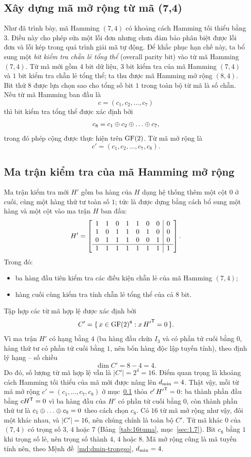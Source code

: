 \subsection{Xây dựng mã mở rộng từ mã (7,4)}
\label{ss:2.7.1}

Như đã trình bày, mã Hamming $(7,4)$ có khoảng cách Hamming tối thiểu bằng $3$.
Điều này cho phép sửa một lỗi đơn nhưng chưa đảm bảo phân biệt được lỗi đơn và
lỗi kép trong quá trình giải mã tự động. Để khắc phục hạn chế này, ta bổ sung
một \emph{bit kiểm tra chẵn lẻ tổng thể} (overall parity bit) vào từ mã Hamming
$(7,4)$. Từ mã mới gồm $4$ bit dữ liệu, $3$ bit kiểm tra của mã Hamming $(7,4)$
và $1$ bit kiểm tra chẵn lẻ tổng thể; ta thu được mã Hamming mở rộng $(8,4)$. Bit thứ $8$ được lựa chọn sao
cho tổng số bit $1$ trong toàn bộ từ mã là số chẵn. Nếu từ mã Hamming ban đầu là
\[
  c = (c_1, c_2, \dots, c_7)
\]
thì bit kiểm tra tổng thể được xác định bởi
\[
  c_8 = c_1 \xor c_2 \xor \dots \xor c_7 ,
\]
trong đó phép cộng được thực hiện trên $\mathrm{GF}(2)$. Từ mã mở rộng là
\[
  c' = (c_1, c_2, \dots, c_7, c_8) .
\]

\subsection{Ma trận kiểm tra của mã Hamming mở rộng}
\label{ss:2.7.2}

Ma trận kiểm tra mới $H'$ gồm ba hàng của $H$ dạng hệ thống thêm một cột $0$ ở
cuối, cùng một hàng thứ tư toàn số $1$; tức là được dựng bằng cách bổ sung một
hàng và một cột vào ma trận $H$ ban đầu:
\begin{equation}\label{eq:Hmr}
  H' = \left[\begin{array}{ccccccc|c} 1 & 1 & 0 & 1 & 1 & 0 & 0 & 0\\ 1 & 0 & 1 & 1 & 0 & 1 & 0 & 0\\ 0 & 1 & 1 & 1 & 0 & 0 & 1 & 0\\ \hline 1 & 1 & 1 & 1 & 1 & 1 & 1 & 1 \end{array}\right] .
\end{equation}
Trong đó:
\begin{itemize}
  \item ba hàng đầu tiên kiểm tra các điều kiện chẵn lẻ của mã Hamming
        $(7,4)$;
  \item hàng cuối cùng kiểm tra tính chẵn lẻ tổng thể của cả $8$ bit.
\end{itemize}
Tập hợp các từ mã hợp lệ được xác định bởi
\[
  C' = \{\, x \in \mathrm{GF}(2)^{8} : x\,{H'}^{\mathsf{T}} = 0 \,\}.
\]
Vì ma trận $H'$ có hạng bằng $4$ (ba hàng đầu chứa $I_3$ và có phần tử cuối bằng
$0$, hàng thứ tư có phần tử cuối bằng $1$, nên bốn hàng độc lập tuyến tính),
theo định lý hạng -- số chiều
\[
  \dim C' = 8 - 4 = 4 .
\]
Do đó, số lượng từ mã hợp lệ vẫn là $\lvert C' \rvert = 2^4 = 16$. Điểm quan
trọng là khoảng cách Hamming tối thiểu của mã mới được nâng lên $d_{\min} = 4$.
Thật vậy, mỗi từ mã mở rộng $c' = (c_1, \dots, c_7, c_8)$ ở mục~\ref{ss:2.7.1}
thỏa $c'\,{H'}^{\mathsf{T}} = 0$: ba thành phần đầu bằng $cH^{\mathsf{T}} = 0$ vì ba hàng đầu
của $H'$ có phần tử cuối bằng $0$, còn thành phần thứ tư là
$c_1 \xor \dots \xor c_8 = 0$ theo cách chọn $c_8$. Có $16$ từ mã mở rộng
như vậy, đôi một khác nhau, và $\lvert C' \rvert = 16$, nên chúng chính là
toàn bộ $C'$. Từ mã khác $0$ của $(7,4)$ có trọng số $3$, $4$ hoặc $7$
(Bảng~\ref{tab:16tuma}, mục~\ref{sec:1.7}). Bit $c_8$ bằng $1$ khi trọng số lẻ, nên
trọng số thành $4$, $4$ hoặc $8$. Mã mở rộng cũng là mã tuyến tính nên, theo
Mệnh đề~\ref{md:dmin-trongso}, $d_{\min} = 4$.

